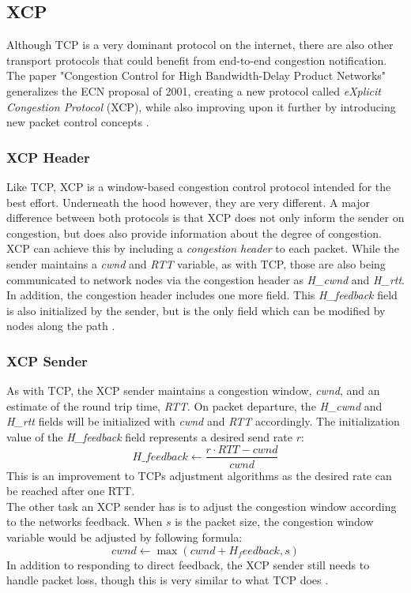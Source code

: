 \documentclass[a4paper,conference]{IEEEtran}
\begin{document}
\subsection{XCP}
Although TCP is a very dominant protocol on the internet, there are also other transport protocols that could benefit from end-to-end congestion notification. The paper "Congestion Control for High Bandwidth-Delay Product Networks"  generalizes the ECN proposal of 2001, creating a new protocol called \textit{eXplicit Congestion Protocol} (XCP), while also improving upon it further by introducing new packet control concepts \cite{katabi2002congestion,1498331}.

\subsubsection*{XCP Header}
Like TCP, XCP is a window-based congestion control protocol intended for the best effort. Underneath the hood however, they are very different. A major difference between both protocols is that XCP does not only inform the sender on congestion, but does also provide information about the degree of congestion. XCP can achieve this by including a \textit{congestion header} to each packet. While the sender maintains a \textit{cwnd} and \textit{RTT} variable, as with TCP, those are also being communicated to network nodes via the congestion header as \textit{H\_cwnd} and \textit{H\_rtt}. In addition, the congestion header includes one more field. This \textit{H\_feedback} field is also initialized by the sender, but is the only field which can be modified by nodes along the path \cite{katabi2002congestion,1498331}.

\subsubsection*{XCP Sender}
As with TCP, the XCP sender maintains a congestion window, \textit{cwnd}, and an estimate of the round trip time, \textit{RTT}. On packet departure, the \textit{H\_cwnd} and \textit{H\_rtt} fields will be initialized with \textit{cwnd} and \textit{RTT} accordingly. The initialization value of the \textit{H\_feedback} field represents a desired send rate $r$:
\[H\_feedback \leftarrow \frac{r \cdot RTT - cwnd}{cwnd}\]
This is an improvement to TCPs adjustment algorithms as the desired rate can be reached after one RTT.\\
The other task an XCP sender has is to adjust the congestion window according to the networks feedback. When $s$ is the packet size, the congestion window variable would be adjusted by following formula:
\[cwnd \leftarrow \max(cwnd + H_feedback, s)\]
In addition to responding to direct feedback, the XCP sender still needs to handle packet loss, though this is very similar to what TCP does \cite{katabi2002congestion}.
\end{document}
